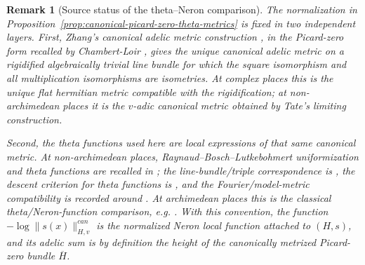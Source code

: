 \documentclass[10pt,a4paper]{amsart}
\theoremstyle{plain}
\newtheorem{remark}[theorem]{Remark}
\theoremstyle{plain}
\numberwithin{equation}{section}
\begin{document}
\begin{remark}[Source status of the theta--Neron comparison]
	\label{rem:theta-neron-source-status}
	The normalization in
	Proposition~\ref{prop:canonical-picard-zero-theta-metrics} is fixed in two
	independent layers.  First, Zhang's canonical adelic metric construction
	\cite[Theorem~2.2]{ZhangAdelicMetrics}, in the Picard-zero form recalled by
	Chambert-Loir \cite[\S1 and final appendix]{CLHeight}, gives the unique
	canonical adelic metric on a rigidified algebraically trivial line bundle for
	which the square isomorphism and all multiplication isomorphisms are isometries.
	At complex places this is the unique flat hermitian metric compatible with the
	rigidification; at non-archimedean places it is the \(v\)-adic canonical metric
	obtained by Tate's limiting construction.
	
	Second, the theta functions used here are local expressions of that same
	canonical metric.  At non-archimedean places, Raynaud--Bosch--Lutkebohmert
	uniformization and theta functions are recalled in \cite[Section~3]{FRSS}; the
	line-bundle/triple correspondence is \cite[Theorem~3.10]{FRSS}, the descent
	criterion for theta functions is \cite[Proposition~3.19 and Definition~3.20]{FRSS},
	and the Fourier/model-metric compatibility is recorded around
	\cite[Remark~3.18 and Proposition~3.19]{FRSS}.  At archimedean places this is
	the classical theta/Neron-function comparison, e.g.
	\cite[Chapter~13, Theorem~1.1]{Lang}.  With this convention, the function
	\(-\log\|s(x)\|^{can}_{H,v}\) is the normalized Neron local function attached
	to \((H,s)\), and its adelic sum is by definition the height of the
	canonically metrized Picard-zero bundle \(\overline H\).
\end{remark}
\end{document}
